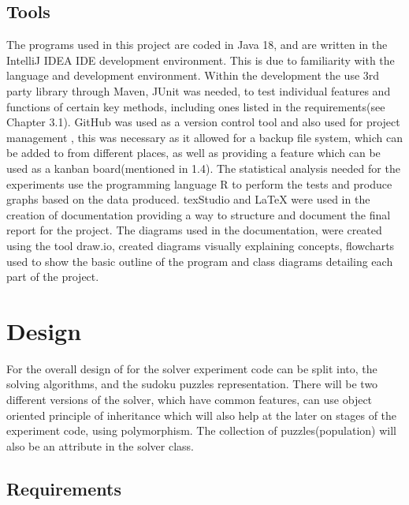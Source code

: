 \documentclass[a4paper,11pt]{article}
\begin{document}
\subsection{Tools}
The programs used in this project are coded in Java 18, and are written in the IntelliJ IDEA IDE  development environment\cite{intJ}. This is due to familiarity with the language and development environment. Within the development the use 3rd party library through Maven\cite{maven}, JUnit\cite{junit} was needed, to test individual features and functions of certain key methods, including ones listed in the requirements(see Chapter 3.1). GitHub\cite{github} was used as a version control tool and also used for project management , this was necessary as it allowed for a backup file system, which can be added to from different places, as well as providing a feature which can be used as a kanban board(mentioned in 1.4).
The statistical analysis needed for the experiments use the programming language R\cite{r} to perform the tests and produce graphs based on the data produced. texStudio and LaTeX\cite{latex} were used in the creation of documentation providing a way to structure and document the final report for the project. The diagrams used in the documentation, were created using the tool draw.io, created diagrams visually explaining concepts, flowcharts used to show the basic outline of the program and class diagrams detailing each part of the project. 


\section{Design}
For the overall design of for the solver experiment code can be split into, the solving algorithms, and the sudoku puzzles representation. There will be two different versions of the solver, which have common features, can use object oriented principle of inheritance which will also help at the later on stages of the experiment code, using polymorphism. The collection of puzzles(population) will also be an attribute in the solver class.

\subsection{Requirements}
\end{document}

